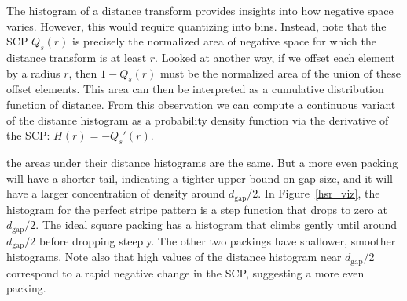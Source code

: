 The histogram of a distance transform provides insights into how negative space varies. 
However, this would require quantizing  into bins.
Instead, note that the SCP $Q_s(r)$ is precisely the normalized area of 
negative space for which the distance transform is at least $r$. 
Looked at another way, if we offset each element by a
radius $r$, then $1-Q_s(r)$ must be the normalized 
area of the union of these offset elements.
This area can then be interpreted as 
a cumulative distribution function of distance.  From this observation
we can compute a continuous variant of the distance histogram as a 
probability density function via the derivative of the SCP: $H(r)=-Q_s'(r)$.


the areas under their distance histograms
are the same.  But a more even packing will have a shorter tail,
indicating a tighter upper bound on gap size, and it will have a larger
concentration of density around $d_\mathrm{gap}/2$.  In Figure~\ref{hsr_viz},
the histogram for the perfect stripe pattern is a step function that drops
to zero at $d_\mathrm{gap}/2$.  The ideal square packing has a histogram
that climbs gently until around $d_\mathrm{gap}/2$ before dropping
steeply.  The other two packings have shallower, smoother histograms.
Note also that high values of the distance histogram near $d_\mathrm{gap}/2$
correspond to a rapid negative change in the SCP, suggesting a more even
packing.

